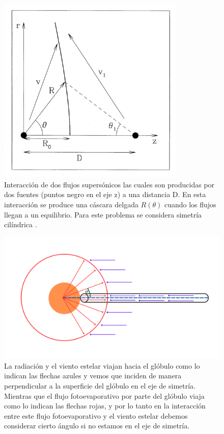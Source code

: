 \documentclass{book}
\begin{document}
\begin{figure}[htb]
    \centering    \includegraphics[width=0.8\textwidth]{images Chapter 2/C2_Canto.jpg}
    \caption{Interacción de dos flujos supersónicos las cuales son producidas por dos fuentes (puntos negro en el eje z) a una distancia D. En esta interacción se produce una cáscara delgada $R(\theta)$ cuando los flujos llegan a un equilibrio. Para este problema se considera simetría cilíndrica \citep{Canto:1996}.}
    \label{fig:Canto1}
\end{figure}

\begin{figure}[htb]
    \centering    \includegraphics[width=\textwidth]{artesanales/ImgFi01-2.pdf}
    \caption{La radiación y el viento estelar viajan hacia el glóbulo como lo indican las flechas azules y vemos que inciden de manera perpendicular a la superficie del glóbulo en el eje de simetría. Mientras que el flujo fotoevaporativo por parte del glóbulo viaja como lo indican las flechas rojas, y por lo tanto en la interacción entre este flujo fotoevaporativo y el viento estelar debemos considerar cierto ángulo si no estamos en el eje de simetría.}
    \label{fig:cilindross}
\end{figure}
\end{document}
